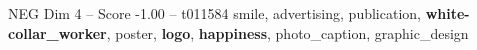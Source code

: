 \begin{textsample}{NEG Dim 4 – Score -1.00 – t011584}  \label{ex:f4_neg_021}
smile, advertising, publication, \textbf{white-collar\_worker}, poster, \textbf{logo}, \textbf{happiness}, photo\_caption, graphic\_design

\end{textsample}
